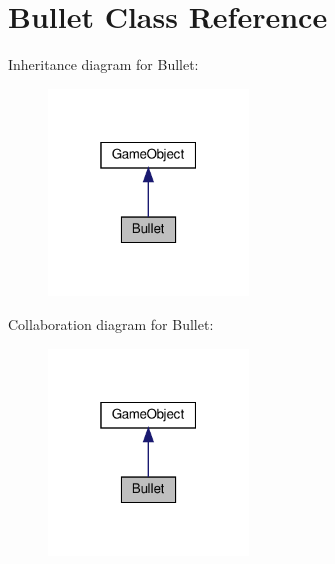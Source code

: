 \hypertarget{class_bullet}{}\section{Bullet Class Reference}
\label{class_bullet}


Inheritance diagram for Bullet\+:
\nopagebreak
\begin{figure}[H]
\begin{center}
\leavevmode
\includegraphics[width=151pt]{class_bullet__inherit__graph}
\end{center}
\end{figure}


Collaboration diagram for Bullet\+:
\nopagebreak
\begin{figure}[H]
\begin{center}
\leavevmode
\includegraphics[width=151pt]{class_bullet__coll__graph}
\end{center}
\end{figure}
